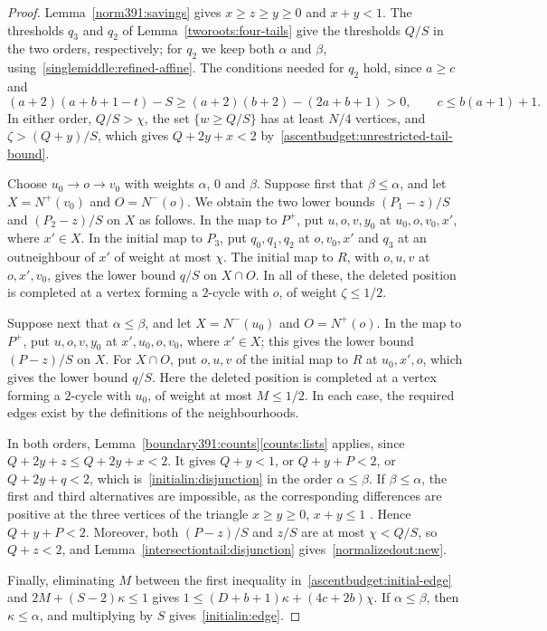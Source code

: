 \begin{proof}
Lemma~\ref{norm391:savings} gives $x\ge z\ge y\ge0$ and $x+y<1$. The thresholds $q_3$ and $q_2$ of Lemma~\ref{tworoots:four-tails}
give the thresholds $Q/S$ in the two orders, respectively; for $q_2$ we keep both $\alpha$ and $\beta$, using~\eqref{singlemiddle:refined-affine}. The conditions needed for $q_2$ hold, since
$a\ge c$ and
\[
 (a+2)(a+b+1-t)-S\ge(a+2)(b+2)-(2a+b+1)>0,
 \qquad c\le b(a+1)+1.
\]
In either order, $Q/S>\chi$, the set $\{w\ge Q/S\}$ has at least
$N/4$ vertices, and $\zeta>(Q+y)/S$, which gives $Q+2y+x<2$ by~\eqref{ascentbudget:unrestricted-tail-bound}.

Choose $u_0\to o\to v_0$ with weights $\alpha$, $0$ and $\beta$.
Suppose first that $\beta\le\alpha$, and let $X=N^+(v_0)$ and $O=N^-(o)$.
We obtain the two lower bounds $(P_1-z)/S$ and $(P_2-z)/S$ on $X$ as follows.
In the map to $P^+$, put $u,o,v,y_0$ at
$u_0,o,v_0,x'$, where $x'\in X$. In the initial map to $P_3$, put $q_0,q_1,q_2$ at
$o,v_0,x'$ and $q_3$ at an outneighbour of $x'$ of weight at most
$\chi$. The initial map to $R$, with $o,u,v$ at $o,x',v_0$, gives the lower bound $q/S$ on $X\cap O$.
In all of these, the deleted position is completed at a vertex forming a $2$-cycle with $o$, of weight $\zeta\le1/2$.

Suppose next that $\alpha\le\beta$, and let $X=N^-(u_0)$ and $O=N^+(o)$.
In the map to $P^+$, put $u,o,v,y_0$ at
$x',u_0,o,v_0$, where $x'\in X$; this gives the lower bound $(P-z)/S$ on $X$.
For $X\cap O$, put $o,u,v$ of the initial map to $R$ at $u_0,x',o$, which gives the lower bound $q/S$.
Here the deleted position is completed at a vertex forming a $2$-cycle with $u_0$, of weight
at most $M\le1/2$. In each case, the required edges exist by the definitions of the neighbourhoods.

In both orders, Lemma~\ref{boundary391:counts}\ref{counts:lists} applies, since
$Q+2y+z\le Q+2y+x<2$. It gives
$Q+y<1$, or $Q+y+P<2$, or $Q+2y+q<2$,
which is~\eqref{initialin:disjunction} in the order $\alpha\le\beta$. If $\beta\le\alpha$, the first
and third alternatives are impossible, as the corresponding differences are
positive at the three vertices of the triangle $x\ge y\ge0$, $x+y\le1$ .
Hence $Q+y+P<2$. Moreover, both $(P-z)/S$ and $z/S$ are at most $\chi<Q/S$, so $Q+z<2$,
and Lemma~\ref{intersectiontail:disjunction} gives~\eqref{normalizedout:new}.

Finally, eliminating $M$ between the first inequality in~\eqref{ascentbudget:initial-edge} and $2M+(S-2)\kappa\le1$ gives $1\le(D+b+1)\kappa+(4c+2b)\chi$. If $\alpha\le\beta$, then $\kappa\le\alpha$, and multiplying by
$S$ gives~\eqref{initialin:edge}.
\end{proof}

